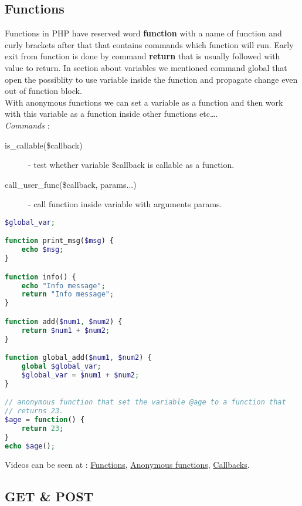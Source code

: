 \documentclass{article}
\begin{document}
\subsection{Functions}
Functions in PHP have reserved word \textbf{function} with a name of function and curly brackets after that that contains commands which function will run. Early exit from function is done by command \textbf{return} that is usually followed with value to return. In section about variables we mentioned command global that open the possiblity to use variable inside the function and propagate change even out of function block. \\ 
With anonymous functions we can set a variable as a function and then work with this variable as a function inside other functions etc\ldots .\\

\textit{Commands} : 
\begin{description}
\item[\hspace{1cm} is\_callable(\$callback)] - test whether variable \$callback is callable as a function. 
\item[\hspace{1cm} call\_user\_func(\$callback, params...)] - call function inside variable with arguments params.
\end{description}

\begin{lstlisting}[language=PHP]
$global_var;

function print_msg($msg) {
	echo $msg;	
}

function info() {
	echo "Info message";
	return "Info message";
}

function add($num1, $num2) {
	return $num1 + $num2;
}

function global_add($num1, $num2) {
	global $global_var;
	$global_var = $num1 + $num2;
}

// anonymous function that set the variable @age to a function that
// returns 23.
$age = function() {
	return 23;
}
echo $age();

\end{lstlisting}
Videos can be seen at : \href{http://youtu.be/KBC3awDI4wc}{Functions}, \href{http://youtu.be/SQu-aXazr5k}{Anonymous functions}, \href{http://youtu.be/gFJsBQIqpto}{Callbacks}.

\subsection{GET \& POST}
\end{document}
